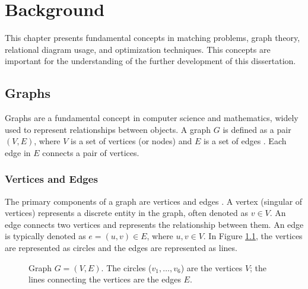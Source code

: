 
\chapter{Background} \label{chap:background}

    This chapter presents fundamental concepts in matching problems, graph theory, relational diagram usage, and optimization techniques. This concepts are important for the understanding of the further development of this dissertation.
    \section{Graphs}
    
        Graphs are a fundamental concept in computer science and mathematics, widely used to represent relationships between objects. A graph \( G \) is defined as a pair \( (V, E) \), where \( V \) is a set of vertices (or nodes) and \( E \) is a set of edges \cite{cormen}. Each edge in \( E \) connects a pair of vertices.

        \subsection{Vertices and Edges}
        
            The primary components of a graph are vertices and edges \cite{cormen, bondy1976graph}. A vertex (singular of vertices) represents a discrete entity in the graph, often denoted as \( v \in V \). An edge connects two vertices and represents the relationship between them. An edge is typically denoted as \( e = (u, v) \in E \), where \( u, v \in V \).
            In Figure \ref{fig:base_graph}, the vertices are represented as circles and the edges are represented as lines.

            
            \begin{figure}[!ht]
                \centering
                \caption[Graph $G = (V, E)$.]{Graph $G = (V, E)$. The circles ($v_1, \ldots, v_6$) are the vertices $V$; the lines connecting the vertices are the edges $E$.} \label{fig:base_graph}
            \end{figure}
        
